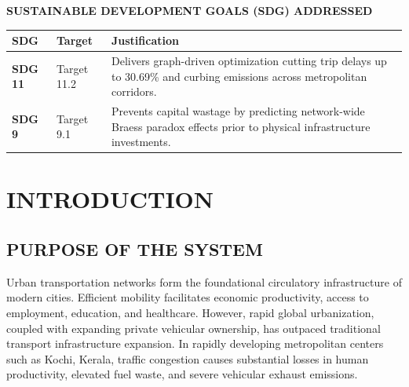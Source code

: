 \documentclass[12pt,a4paper]{report}
\begin{document}
\vspace{0.25cm}
\begin{center}
    {\normalsize\bfseries SUSTAINABLE DEVELOPMENT GOALS (SDG) ADDRESSED\par}
\end{center}
\vspace{-0.15cm}
\noindent
\begin{center}
\scriptsize
\begin{tabularx}{\textwidth}{|l|l|X|}
\hline
\textbf{SDG} & \textbf{Target} & \textbf{Justification} \\ \hline
\textbf{SDG 11} & Target 11.2 & Delivers graph-driven optimization cutting trip delays up to 30.69\% and curbing emissions across metropolitan corridors. \\ \hline
\textbf{SDG 9} & Target 9.1 & Prevents capital wastage by predicting network-wide Braess paradox effects prior to physical infrastructure investments. \\ \hline
\end{tabularx}
\end{center}

\newpage
{}
\tableofcontents

\newpage
\begingroup
\makeatletter
\renewcommand\clearpage{}
\renewcommand\cleardoublepage{}
\makeatother
\listoffigures
\vspace{0.8cm}
\listoftables
\endgroup

\newpage
{}
\setcounter{page}{5}

\chapter{INTRODUCTION}
\label{chap:intro}

\section{PURPOSE OF THE SYSTEM}
Urban transportation networks form the foundational circulatory infrastructure of modern cities. Efficient mobility facilitates economic productivity, access to employment, education, and healthcare. However, rapid global urbanization, coupled with expanding private vehicular ownership, has outpaced traditional transport infrastructure expansion. In rapidly developing metropolitan centers such as Kochi, Kerala, traffic congestion causes substantial losses in human productivity, elevated fuel waste, and severe vehicular exhaust emissions.
\end{document}
